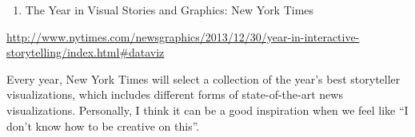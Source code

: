 \documentclass[]{book}
\providecommand{\tightlist}{%
  \setlength{\itemsep}{0pt}\setlength{\parskip}{0pt}}
\theoremstyle{definition}
\theoremstyle{definition}
\theoremstyle{definition}
\theoremstyle{remark}
\begin{document}
\begin{enumerate}
\def\labelenumi{\arabic{enumi}.}
\setcounter{enumi}{3}
\tightlist
\item
  The Year in Visual Stories and Graphics: New York Times
\end{enumerate}

\url{http://www.nytimes.com/newsgraphics/2013/12/30/year-in-interactive-storytelling/index.html\#dataviz}

Every year, New York Times will select a collection of the year's best
storyteller visualizations, which includes different forms of
state-of-the-art news visualizations. Personally, I think it can be a
good inspiration when we feel like ``I don't know how to be creative on
this''.


\end{document}
